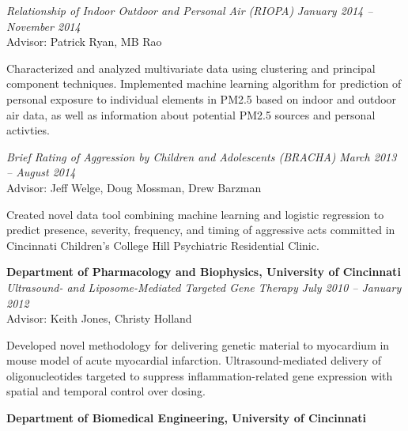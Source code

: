 \documentclass[margin,line]{res}
\newenvironment{list1}{
  \begin{list}{\ding{113}}{%
      \setlength{\itemsep}{0in}
      \setlength{\parsep}{0in} \setlength{\parskip}{0in}
      \setlength{\topsep}{0in} \setlength{\partopsep}{0in} 
      \setlength{\leftmargin}{0.17in}}}{\end{list}}
\begin{document}
\begin{resume}
\textsl{Relationship of Indoor Outdoor and Personal Air  (RIOPA)}
\hfill \textit{January 2014 -- November 2014} \\
Advisor: Patrick Ryan, MB Rao \\
\vspace{-0.13in}
\begin{list1}
\item[] Characterized and analyzed multivariate data using clustering and principal component techniques. Implemented machine learning algorithm for prediction of personal exposure to individual elements in PM2.5 based on indoor and outdoor air data, as well as information about potential PM2.5 sources and personal activties.
\end{list1}



\textsl{Brief Rating of Aggression by Children and Adolescents (BRACHA)}
\hfill \textit{March 2013 -- August 2014} \\
Advisor: Jeff Welge, Doug Mossman, Drew Barzman \\
\vspace{-0.13in}
\begin{list1}
\item[] Created novel data tool combining machine learning and logistic regression to predict presence, severity, frequency, and timing of aggressive acts committed in Cincinnati Children's College Hill Psychiatric Residential Clinic.
\end{list1}

 
\textbf{Department of Pharmacology and Biophysics, University of Cincinnati} \\

\vspace{-0.2in}
\textsl{Ultrasound- and Liposome-Mediated Targeted Gene Therapy}
\hfill \textit{July 2010 -- January 2012} \\
Advisor: Keith Jones, Christy Holland \\
\vspace{-0.13in}
\begin{list1}
\item[] Developed novel methodology for delivering genetic material to myocardium in mouse model of acute myocardial infarction. Ultrasound-mediated delivery of oligonucleotides targeted to suppress inflammation-related gene expression with spatial and temporal control over dosing.
\end{list1}


\textbf{Department of Biomedical Engineering, University of Cincinnati}\\


\end{resume}
\end{document}
